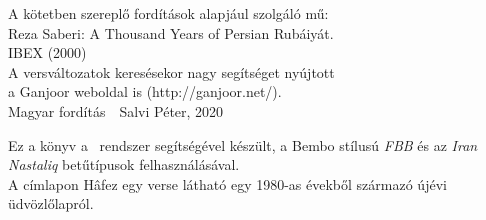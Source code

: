 \thispagestyle{empty}
\begin{center}
  A kötetben szereplő fordítások alapjául szolgáló mű:\\
  \bigskip
  Reza Saberi: A Thousand Years of Persian Rubáiyát.\\
  IBEX (2000)\\
  \bigskip
  A versváltozatok keresésekor nagy segítséget nyújtott\\
  a Ganjoor weboldal is (http://ganjoor.net/).\\
  \bigskip
  Magyar fordítás\ \textcopyright\ Salvi Péter, 2020
\end{center}
\vspace*{\fill}
{\small Ez a könyv a \XeLaTeX\ rendszer segítségével készült, a Bembo stílusú \emph{FBB}
  és az \emph{Iran Nastaliq} betűtípusok felhasználásával.\\
  A címlapon Hâfez egy verse látható egy 1980-as évekből származó újévi üdvözlőlapról.
}

